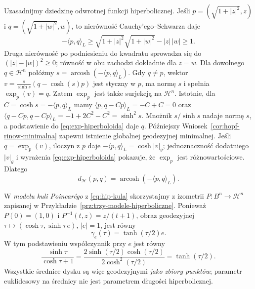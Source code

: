 \begin{przyklad}
Uzasadnijmy dziedzinę odwrotnej funkcji hiperbolicznej.
Jeśli $p=(\sqrt{1+|z|^2},z)$ i $q=(\sqrt{1+|w|^2},w)$,
to nierówność Cauchy'ego--Schwarza daje
\[
 -\langle p,q\rangle_L
 \geq\sqrt{1+|z|^2}\sqrt{1+|w|^2}-|z|\,|w|\geq1.
\]
Druga nierówność po podniesieniu do kwadratu sprowadza się
do $(|z|-|w|)^2\geq0$; równość w obu zachodzi dokładnie
dla $z=w$. Dla dowolnego $q\in\mathcal H^n$ połóżmy
$s=\operatorname{arcosh}(-\langle p,q\rangle_L)$.
Gdy $q\ne p$, wektor
$v=\frac{s}{\sinh s}(q-\cosh(s)p)$
jest styczny w $p$, ma normę $s$ i spełnia
$\exp_p(v)=q$. Zatem $\exp_p$ jest także
surjekcją na $\mathcal H^n$.
Istotnie, dla $C=\cosh s=-\langle p,q\rangle_L$
mamy $\langle p,q-Cp\rangle_L=-C+C=0$ oraz
$\langle q-Cp,q-Cp\rangle_L=-1+2C^2-C^2
=\sinh^2s$. Mnożnik $s/\sinh s$ nadaje normę $s$,
a podstawienie do \eqref{eq:exp-hiperboloida} daje $q$.
Późniejszy Wniosek~\ref{cor:hopf-rinow-minimalna}
zapewni istnienie globalnej geodezyjnej minimalnej.
Jeśli $q=\exp_p(v)$, iloczyn z $p$ daje
$-\langle p,q\rangle_L=\cosh|v|_g$;
jednoznaczność dodatniego $|v|_g$
i wyrażenia \eqref{eq:exp-hiperboloida} pokazuje,
że $\exp_p$ jest różnowartościowe. Dlatego
\begin{equation}\label{eq:odleglosc-hiperboloida}
 d_{\mathcal H}(p,q)
 =\operatorname{arcosh}(-\langle p,q\rangle_L).
\end{equation}

W \emph{modelu kuli Poincarégo} z
\eqref{eq:hip-kula} skorzystajmy z izometrii
$P:B^n\to\mathcal H^n$ zapisanej w
Przykładzie~\ref{prz:trzy-modele-hiperboliczne}.
Ponieważ $P(0)=(1,0)$ i
$P^{-1}(t,z)=z/(t+1)$, obraz geodezyjnej
$\tau\mapsto(\cosh\tau,\sinh\tau\,e)$,
$|e|=1$, jest równy
\begin{equation}\label{eq:geodezyjna-dysk-radialna}
 \gamma_e(\tau)=\tanh(\tau/2)e.
\end{equation}
W tym podstawieniu współczynnik przy $e$ jest równy
\[
 \frac{\sinh\tau}{\cosh\tau+1}
 =\frac{2\sinh(\tau/2)\cosh(\tau/2)}{2\cosh^2(\tau/2)}
 =\tanh(\tau/2).
\]
Wszystkie średnice dysku są więc geodezyjnymi
\emph{jako zbiory punktów}; parametr euklidesowy
na średnicy nie jest parametrem długości hiperbolicznej.


\end{przyklad}
